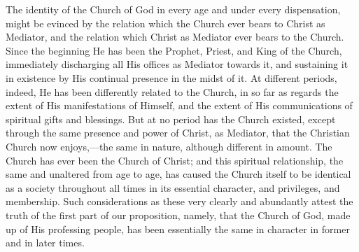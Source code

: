 \documentclass[]{book}
\begin{document}
\begin{enumerate}
  The identity of the Church of God in every age and under every dispensation, might be evinced by the relation which the Church ever bears to Christ as Mediator, and the relation which Christ as Mediator ever bears to the Church. Since the beginning He has been the Prophet, Priest, and King of the Church, immediately discharging all His offices as Mediator towards it, and sustaining it in existence by His continual presence in the midst of it. At different periods, indeed, He has been differently related to the Church, in so far as regards the extent of His manifestations of Himself, and the extent of His communications of spiritual gifts and blessings. But at no period has the Church existed, except through the same presence and power of Christ, as Mediator, that the Christian Church now enjoys,---the same in nature, although different in amount. The Church has ever been the Church of Christ; and this spiritual relationship, the same and unaltered from age to age, has caused the Church itself to be identical as a society throughout all times in its essential character, and privileges, and membership. Such considerations as these very clearly and abundantly attest the truth of the first part of our proposition, namely, that the Church of God, made up of His professing people, has been essentially the same in character in former and in later times.
\end{enumerate}
\end{document}
